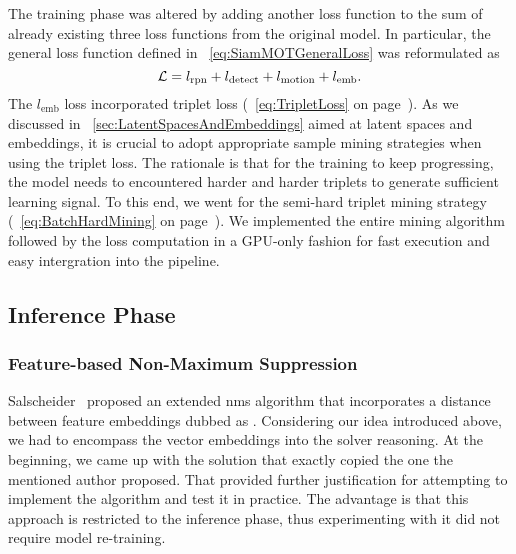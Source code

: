 The training phase was altered by adding another loss function to the sum of already existing three loss functions from the original model. In particular, the general \siammot{} loss function defined in \eqstr{}~\ref{eq:SiamMOTGeneralLoss} was reformulated as
\begin{equation}
    \label{eq:SiamMOTFeatureEmbLoss}
    \mathcal{L} = l_{\text{rpn}} + l_{\text{detect}} + l_{\text{motion}} + l_{\text{emb}}.
\end{equation}
The $l_{\text{emb}}$ loss incorporated triplet loss (\eqstr{}~\ref{eq:TripletLoss} on page~\pageref{eq:TripletLoss}). As we discussed in \sectionstr{}~\ref{sec:LatentSpacesAndEmbeddings} aimed at latent spaces and embeddings, it is crucial to adopt appropriate sample mining strategies when using the triplet loss. The rationale is that for the training to keep progressing, the model needs to encountered harder and harder triplets to generate sufficient learning signal. To this end, we went for the semi-hard triplet mining strategy (\eqstr{}~\ref{eq:BatchHardMining} on page~\pageref{eq:BatchHardMining}). We implemented the entire mining algorithm followed by the loss computation in a GPU-only fashion for fast execution and easy intergration into the pipeline.

\subsection{Inference Phase}

\subsubsection{Feature-based Non-Maximum Suppression}
\label{sssec:FeatureNonMaximumSuppression}

Salscheider~\cite{salscheider2020featurenms} proposed an extended \gls{nms} algorithm that incorporates a distance between feature embeddings dubbed as \featurenms{}. Considering our idea introduced above, we had to encompass the vector embeddings into the solver reasoning. At the beginning, we came up with the solution that exactly copied the one the mentioned author proposed. That provided further justification for attempting to implement the algorithm and test it in practice. The advantage is that this approach is restricted to the inference phase, thus experimenting with it did not require model re-training.

